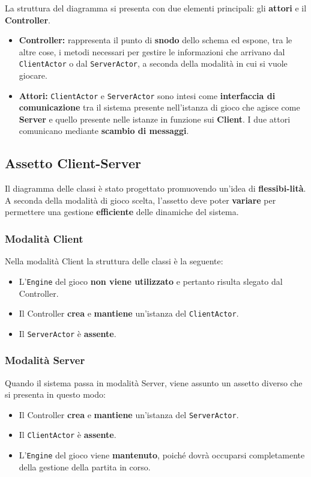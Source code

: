La struttura del diagramma si presenta con due elementi principali: gli \textbf{attori} e il \textbf{Controller}.
\begin{itemize}
    \item \textbf{Controller:} rappresenta il punto di \textbf{snodo} dello schema ed espone, tra le altre cose, i metodi necessari per gestire le informazioni che arrivano dal \texttt{ClientActor} o dal \texttt{ServerActor}, a seconda della modalità in cui si vuole giocare.
    \item \textbf{Attori:} \texttt{ClientActor} e \texttt{ServerActor} sono intesi come \textbf{interfaccia di comunicazione} tra il sistema presente nell'istanza di gioco che agisce come \textbf{Server} e quello presente nelle istanze in funzione sui \textbf{Client}. I due attori comunicano mediante \textbf{scambio di messaggi}.
\end{itemize}

\subsection{Assetto Client-Server} 
Il diagramma delle classi è stato progettato promuovendo un'idea di \textbf{flessibi-lità}. A seconda della modalità di gioco scelta, l'assetto deve poter \textbf{variare} per permettere una gestione \textbf{efficiente} delle dinamiche del sistema.
    \subsubsection{Modalità Client}
        Nella modalità Client la struttura delle classi è la seguente:
        \begin{itemize}
            \item L'\texttt{Engine} del gioco \textbf{non viene utilizzato} e pertanto risulta slegato dal Controller.
            \item Il Controller \textbf{crea} e \textbf{mantiene} un'istanza del \texttt{ClientActor}.
            \item Il \texttt{ServerActor} è \textbf{assente}.
        \end{itemize}

    \subsubsection{Modalità Server}
    Quando il sistema passa in modalità Server, viene assunto un assetto diverso che si presenta in questo modo:
        \begin{itemize}
            \item Il Controller \textbf{crea} e \textbf{mantiene} un'istanza del \texttt{ServerActor}.
            \item Il \texttt{ClientActor} è \textbf{assente}.
            \item L'\texttt{Engine} del gioco viene \textbf{mantenuto}, poiché dovrà occuparsi completamente della gestione della partita in corso.
        \end{itemize}    
        
